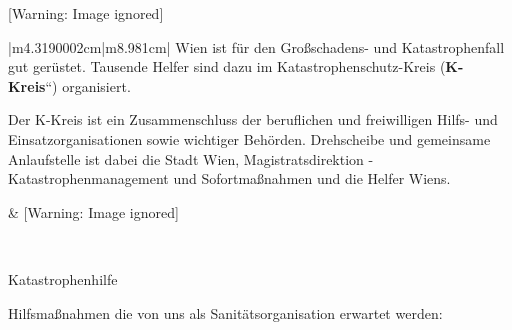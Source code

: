 \documentclass{article}
\makeatletter
\newcommand\gT[1]{\textbf{\textup{\textcolor[rgb]{0.0,0.5019608,0.0}{#1}}}}
\newcommand\captionof[1]{\def\@captype{#1}\caption}
\makeatother
\begin{document}
\begin{center}
 [Warning: Image ignored] %

\end{center}
\begin{center}
\tablehead{}\begin{supertabular}{|m{4.3190002cm}|m{8.981cm}|}
\hline
{\mdseries Wien ist f\"ur den Gro{\ss}\-schadens- und Katastrophenfall
gut ger\"ustet. Tausende Helfer sind dazu im Katastrophen\-schutz-Kreis
({\quotedblbase}\gT{K-Kreis}{\textquotedblleft})
org\-anisiert.}

{\mdseries Der K-Kreis ist ein Zu\-sammen\-schluss der beruflichen und
freiwilligen Hilfs- und Ein\-satz\-organisationen sowie wichtiger
Beh\"orden. Dreh\-scheibe und gemeinsame Anlaufstelle ist dabei die
Stadt Wien, Magistrats\-direktion - Katastrophen\-manage\-ment und
Sofort\-ma{\ss}\-nahmen und die Helfer Wiens.}

 &
 [Warning: Image ignored] %
\captionof{figure}[Der K-Kreis]{Der K-Kreis}


\\\hline
\end{supertabular}
\end{center}
{\mdseries\color[rgb]{0.0,0.0,0.5019608}
Katastrophenhilfe}

{\mdseries
Hilfsma{\ss}nahmen die von uns als Sanit\"atsorganisation erwartet
werden:}
\end{document}
